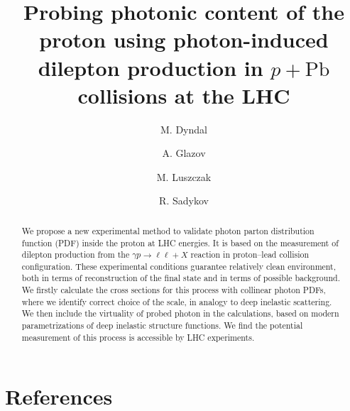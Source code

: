 \documentclass[preprint,12pt]{revtex4}
\begin{document}
\title{Probing photonic content of the proton using photon-induced dilepton production in $p+\textrm{Pb}$ collisions at the LHC}


\author{M. Dyndal}
\address{DESY}
\author{A. Glazov}
\address{DESY}
\author{M. Luszczak}
\address{...}
\author{R. Sadykov}
\address{...}



\begin{abstract}
We propose a new experimental method to validate  photon parton distribution function (PDF) inside the proton at LHC energies.
It is based on the measurement of dilepton production from the $\gamma p\rightarrow\ell\ell+X$ reaction in proton--lead collision configuration. These experimental conditions guarantee relatively clean environment, both in terms of reconstruction of the final state and in terms of possible background.
We firstly calculate the cross sections for this process with collinear photon PDFs, where we identify correct choice of the scale, in analogy to deep inelastic scattering.
We then include the virtuality of probed photon in the calculations, based on modern parametrizations of deep inelastic structure functions.
We find the potential measurement of this process is accessible by LHC experiments.
\end{abstract}




\maketitle












\section*{References}


\end{document}
